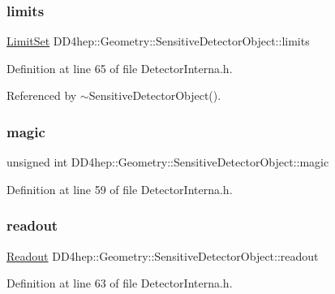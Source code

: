 \subsubsection{\texorpdfstring{limits}{limits}}
{\footnotesize\ttfamily \hyperlink{class_d_d4hep_1_1_geometry_1_1_limit_set}{Limit\+Set} D\+D4hep\+::\+Geometry\+::\+Sensitive\+Detector\+Object\+::limits}



Definition at line 65 of file Detector\+Interna.\+h.



Referenced by $\sim$\+Sensitive\+Detector\+Object().

\hypertarget{class_d_d4hep_1_1_geometry_1_1_sensitive_detector_object_aa4d14ed3d51869d676732f3f19769baa}{}\label{class_d_d4hep_1_1_geometry_1_1_sensitive_detector_object_aa4d14ed3d51869d676732f3f19769baa} 
\subsubsection{\texorpdfstring{magic}{magic}}
{\footnotesize\ttfamily unsigned int D\+D4hep\+::\+Geometry\+::\+Sensitive\+Detector\+Object\+::magic}



Definition at line 59 of file Detector\+Interna.\+h.

\hypertarget{class_d_d4hep_1_1_geometry_1_1_sensitive_detector_object_a2bdcbb790c3ef059c619c250e082688d}{}\label{class_d_d4hep_1_1_geometry_1_1_sensitive_detector_object_a2bdcbb790c3ef059c619c250e082688d} 
\subsubsection{\texorpdfstring{readout}{readout}}
{\footnotesize\ttfamily \hyperlink{class_d_d4hep_1_1_geometry_1_1_readout}{Readout} D\+D4hep\+::\+Geometry\+::\+Sensitive\+Detector\+Object\+::readout}



Definition at line 63 of file Detector\+Interna.\+h.




